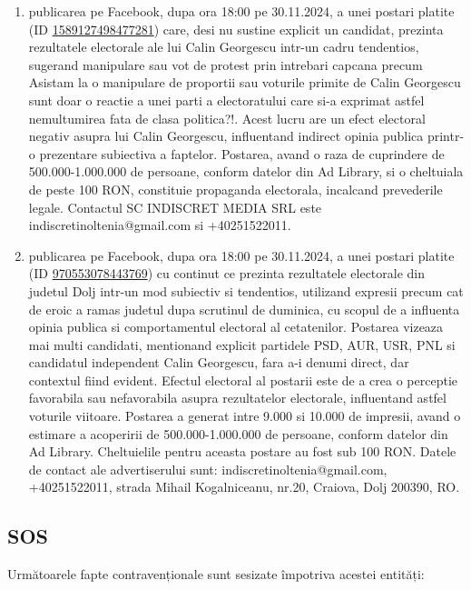 \documentclass[a4paper,12pt]{article}
\begin{document}
\begin{enumerate}[leftmargin=*, label=\arabic*.)]
    \item publicarea pe Facebook, dupa ora 18:00 pe 30.11.2024, a unei postari platite (ID \href{https://www.facebook.com/ads/library/?id=1589127498477281}{1589127498477281}) care, desi nu sustine explicit un candidat, prezinta rezultatele electorale ale lui Calin Georgescu intr-un cadru tendentios, sugerand manipulare sau vot de protest prin intrebari capcana precum Asistam la o manipulare de proportii sau voturile primite de Calin Georgescu sunt doar o reactie a unei parti a electoratului care si-a exprimat astfel nemultumirea fata de clasa politica?!.  Acest lucru are un efect electoral negativ asupra lui Calin Georgescu, influentand indirect opinia publica printr-o prezentare subiectiva a faptelor. Postarea, avand o raza de cuprindere de 500.000-1.000.000 de persoane, conform datelor din Ad Library, si o cheltuiala de peste 100 RON, constituie propaganda electorala, incalcand prevederile legale.  Contactul SC INDISCRET MEDIA SRL este indiscretinoltenia@gmail.com si +40251522011.
    \item publicarea pe Facebook, dupa ora 18:00 pe 30.11.2024, a unei postari platite (ID \href{https://www.facebook.com/ads/library/?id=970553078443769}{970553078443769}) cu continut ce prezinta rezultatele electorale din judetul Dolj intr-un mod subiectiv si tendentios, utilizand expresii precum cat de eroic a ramas judetul dupa scrutinul de duminica, cu scopul de a influenta opinia publica si comportamentul electoral al cetatenilor.  Postarea vizeaza mai multi candidati, mentionand explicit partidele PSD, AUR, USR, PNL si candidatul independent Calin Georgescu, fara a-i denumi direct, dar contextul fiind evident.  Efectul electoral al postarii este de a crea o perceptie favorabila sau nefavorabila asupra rezultatelor electorale, influentand astfel voturile viitoare.  Postarea a generat intre 9.000 si 10.000 de impresii, avand o estimare a acoperirii de 500.000-1.000.000 de persoane, conform datelor din Ad Library.  Cheltuielile pentru aceasta postare au fost sub 100 RON.  Datele de contact ale advertiserului sunt: indiscretinoltenia@gmail.com, +40251522011, strada Mihail Kogalniceanu, nr.20, Craiova, Dolj 200390, RO.
\end{enumerate}

\vspace{0.5cm}

\subsection{SOS}
Următoarele fapte contravenționale sunt sesizate împotriva acestei entități:
\end{document}
